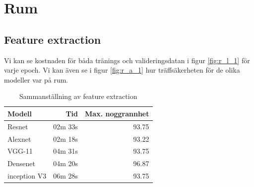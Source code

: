 \documentclass[]{kththesis}
\begin{document}
\section{Rum}

\subsection{Feature extraction}
Vi kan se kostnaden för båda tränings och valideringsdatan i figur \ref{fig:r_l_1} för varje epoch. Vi kan även se i figur \ref{fig:r_a_1} hur träffsäkerheten för de olika modeller var på rum.

\begin{table}
  \centering
  \begin{tabular}{|l|r|r|}
    Modell & Tid & Max. noggrannhet \\ 
    \hline
    Resnet       & 02m 33s & 93.75 \\
    Alexnet      & 02m 18s & 93.22 \\
    VGG-11       & 04m 31s & 93.75 \\
    Densenet     & 04m 20s & 96.87 \\
    inception V3 & 06m 28s & 93.75 \\
  \end{tabular}
  \caption{Sammanställning av feature extraction}
\end{table}
\end{document}

